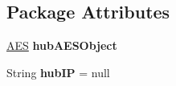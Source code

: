\subsection*{\-Package \-Attributes}
\begin{DoxyCompactItemize}
\item 
\hypertarget{classhub_1_1_hub_ab7a2e46be733450e3089efb7092c952b}{
\hyperlink{classsecurity_1_1_a_e_s}{\-A\-E\-S} {\bfseries hub\-A\-E\-S\-Object}}
\label{classhub_1_1_hub_ab7a2e46be733450e3089efb7092c952b}

\item 
\hypertarget{classhub_1_1_hub_afc93c8d0d8b9a6f1b13b4bee16728c5b}{
\-String {\bfseries hub\-I\-P} = null}
\label{classhub_1_1_hub_afc93c8d0d8b9a6f1b13b4bee16728c5b}

\end{DoxyCompactItemize}
